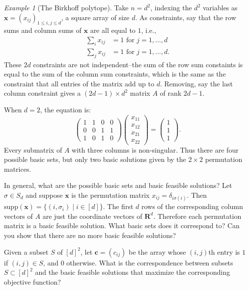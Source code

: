 \documentclass{amsbook}
\newcommand{\xx}{\mathbf x}
\newcommand{\cc}{\mathbf c}
\newcommand{\supp}{\mathrm{supp}}
\newcommand{\RR}{\mathbf R}
\theoremstyle{definition}
\theoremstyle{remark}
\newtheorem{example}[theorem]{Example}
\begin{document}
\begin{example}[The Birkhoff polytope]
  \label{example:birkhoff}
  Take $n=d^2$, indexing the $d^2$ variables as $\xx=(x_{ij})_{1\leq i,j\leq d}$, a square array of size $d$.
  As constraints, say that the row sums and column sums of $\xx$ are all equal to $1$, i.e.,
  \begin{align*}
    \sum_i x_{ij} &= 1 \text{ for } j=1,\dotsc,d\\
    \sum_j x_{ij} &= 1 \text{ for } j=1,\dotsc,d.
  \end{align*}
  These $2d$ constraints are not independent--the sum of the row sum constaints is equal to the sum of the column sum constraints, which is the same as the constraint that all entries of the matrix add up to $d$.
  Removing, say the last column constraint gives a $(2d-1)\times d^2$ matrix $A$ of rank $2d-1$.

  When $d=2$, the equation is:
  \begin{equation}
    \label{eq:birkhoff2}
    \begin{pmatrix}
      1 & 1 & 0 & 0\\
      0 & 0 & 1 & 1\\
      1 & 0 & 1 & 0
    \end{pmatrix}
    \begin{pmatrix}
      x_{11}\\x_{12}\\x_{21}\\x_{22}
    \end{pmatrix}
    =
    \begin{pmatrix}
     1\\1\\1
    \end{pmatrix}.
  \end{equation}
  Every submatrix of $A$ with three columns is non-singular.
  Thus there are four possible basic sets, but only two basic solutions given by the $2\times 2$ permutation matrices.

  In general, what are the possible basic sets and basic feasible solutions?
  Let $\sigma\in S_d$ and suppose $\xx$ is the permutation matrix $x_{ij}=\delta_{i\sigma(i)}$.
  Then $\supp(\xx)=\{(i,\sigma_i)\mid i\in [d]\}$.
  The first $d$ rows of the corresponding column vectors of $A$ are just the coordinate vectors of $\RR^d$.
  Therefore each permutation matrix is a basic feasible solution.
  What basic sets does it correspond to?
  Can you show that there are no more basic feasible solutions?
  
  Given a subset $S$ of $[d]^2$, let $\cc=(c_{ij})$ be the array whose $(i,j)$th entry is $1$ if $(i,j)\in S$, and $0$ otherwise.
  What is the correspondence between subsets $S\subset [d]^2$ and the basic feasible solutions that maximize the corresponding objective function?
\end{example}
\end{document}
